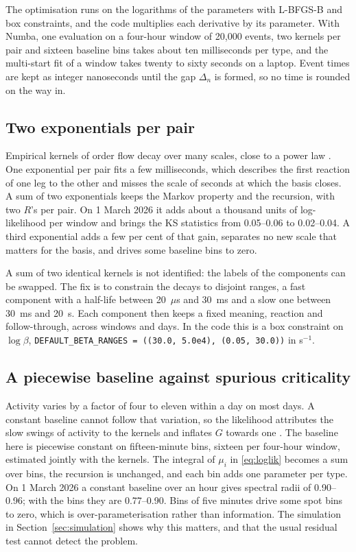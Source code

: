 \documentclass[a4paper,11pt]{article}
\begin{document}
The optimisation runs on the logarithms of the parameters with L-BFGS-B and box constraints, and the code multiplies each derivative by its parameter. With Numba, one evaluation on a four-hour window of 20,000 events, two kernels per pair and sixteen baseline bins takes about ten milliseconds per type, and the multi-start fit of a window takes twenty to sixty seconds on a laptop. Event times are kept as integer nanoseconds until the gap $\Delta_n$ is formed, so no time is rounded on the way in.

\subsection{Two exponentials per pair}

Empirical kernels of order flow decay over many scales, close to a power law \cite{hardiman2013}. One exponential per pair fits a few milliseconds, which describes the first reaction of one leg to the other and misses the scale of seconds at which the basis closes. A sum of two exponentials keeps the Markov property and the recursion, with two $R$'s per pair. On 1 March 2026 it adds about a thousand units of log-likelihood per window and brings the KS statistics from 0.05--0.06 to 0.02--0.04. A third exponential adds a few per cent of that gain, separates no new scale that matters for the basis, and drives some baseline bins to zero.

A sum of two identical kernels is not identified: the labels of the components can be swapped. The fix is to constrain the decays to disjoint ranges, a fast component with a half-life between 20~$\mu$s and 30~ms and a slow one between 30~ms and 20~s. Each component then keeps a fixed meaning, reaction and follow-through, across windows and days. In the code this is a box constraint on $\log \beta$, \texttt{DEFAULT\_BETA\_RANGES = ((30.0, 5.0e4), (0.05, 30.0))} in s$^{-1}$.

\subsection{A piecewise baseline against spurious criticality}\label{sec:baseline}

Activity varies by a factor of four to eleven within a day on most days. A constant baseline cannot follow that variation, so the likelihood attributes the slow swings of activity to the kernels and inflates $G$ towards one \cite{filimonov2015}. The baseline here is piecewise constant on fifteen-minute bins, sixteen per four-hour window, estimated jointly with the kernels. The integral of $\mu_i$ in \eqref{eq:loglik} becomes a sum over bins, the recursion is unchanged, and each bin adds one parameter per type. On 1 March 2026 a constant baseline over an hour gives spectral radii of 0.90--0.96; with the bins they are 0.77--0.90. Bins of five minutes drive some spot bins to zero, which is over-parameterisation rather than information. The simulation in Section~\ref{sec:simulation} shows why this matters, and that the usual residual test cannot detect the problem.
\end{document}
